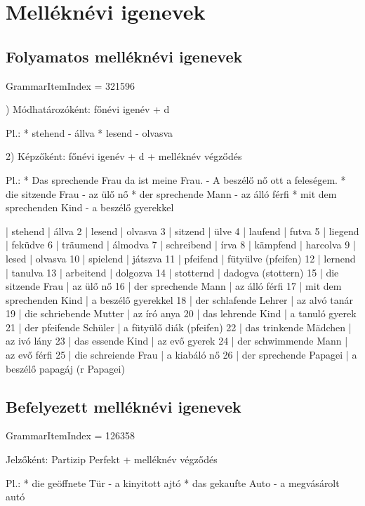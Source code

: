 \documentclass{article}
\newenvironment{desc}{\verbatim}{\endverbatim}
\newenvironment{exmp}{\verbatim}{\endverbatim}
\begin{document}
\section{Melléknévi igenevek}

\subsection{Folyamatos melléknévi igenevek}

GrammarItemIndex = 321596

\begin{desc}
1) Módhatározóként: főnévi igenév + d

Pl.: * stehend - állva
* lesend - olvasva

2) Képzőként: főnévi igenév + d + melléknév végződés

Pl.: * Das sprechende Frau da ist meine Frau. - A beszélő nő ott a feleségem.
* die sitzende Frau - az ülő nő
* der sprechende Mann - az álló férfi
* mit dem sprechenden Kind - a beszélő gyerekkel
\end{desc}

\begin{exmp}
1 | stehend | állva
2 | lesend | olvasva
3 | sitzend | ülve
4 | laufend | futva
5 | liegend | feküdve
6 | träumend | álmodva
7 | schreibend | írva
8 | kämpfend | harcolva
9 | lesed | olvasva
10 | spielend | játszva
11 | pfeifend | fütyülve (pfeifen)
12 | lernend | tanulva
13 | arbeitend | dolgozva
14 | stotternd | dadogva (stottern)
15 | die sitzende Frau | az ülő nő
16 | der sprechende Mann | az álló férfi
17 | mit dem sprechenden Kind | a beszélő gyerekkel
18 | der schlafende Lehrer | az alvó tanár
19 | die schriebende Mutter | az író anya
20 | das lehrende Kind | a tanuló gyerek
21 | der pfeifende Schüler | a fütyülő diák (pfeifen)
22 | das trinkende Mädchen | az ivó lány
23 | das essende Kind | az evő gyerek
24 | der schwimmende Mann | az evő férfi
25 | die schreiende Frau | a kiabáló nő
26 | der sprechende Papagei | a beszélő papagáj (r Papagei)
\end{exmp}

\subsection{Befelyezett melléknévi igenevek}

GrammarItemIndex = 126358

\begin{desc}
Jelzőként: Partizip Perfekt + melléknév végződés

Pl.: * die geöffnete Tür - a kinyitott ajtó
* das gekaufte Auto - a megvásárolt autó
\end{desc}
\end{document}
